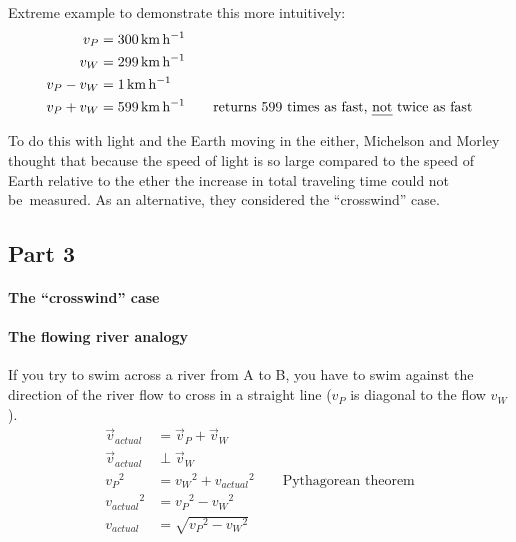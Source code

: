 \documentclass[pagesize,headsepline,10pt,parskip=half]{scrreprt}
\begin{document}
          \begin{samepage}
            Extreme example to demonstrate this more intuitively:
            \begin{align*}
              v_P &= \SI{300}{\kilo\meter\per\hour}\\
              v_W &= \SI{299}{\kilo\meter\per\hour}\\
              v_P - v_W &= \SI{1}{\kilo\meter\per\hour}\\
              v_P + v_W &= \SI{599}{\kilo\meter\per\hour} \qquad \text{returns 599 times as fast, \emph{not} twice as fast}
            \end{align*}
          \end{samepage}

          To do this with light and the Earth moving in the either, Michelson and Morley
          thought that because the speed of light is so large compared to the speed
          of Earth relative to the ether the increase in total traveling time could not
          be~measured.  As an alternative, they considered the “crosswind” case.

      \subsection{Part 3}
        \paragraph{The “crosswind” case}
        \paragraph{The flowing river analogy}
          If you try to swim across a river from A to B, you have to swim against
          the direction of the river flow to cross in a straight line ($v_P$ is
          diagonal to the flow $v_W$).
          \begin{align*}
            \vec{v}_{actual} &= \vec{v}_P + \vec{v}_W\\
            \vec{v}_{actual} &\perp \vec{v}_W\\
            {v_P}^2 &= {v_W}^2 + {v_{actual}}^2 \qquad \text{Pythagorean theorem}\\
            {v_{actual}}^2 &= {v_P}^2 - {v_W}^2\\
            v_{actual} &= \sqrt{{v_P}^2 - {v_W}^2}
          \end{align*}
\end{document}
